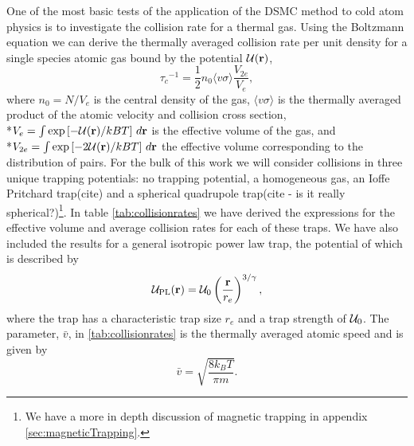 One of the most basic tests of the application of the DSMC method to cold atom physics is to investigate the collision rate for a thermal gas.
Using the Boltzmann equation we can derive \cite{Walraven2010} the thermally averaged collision rate per unit density for a single species atomic gas bound by the potential ${\cal U}(\mathbf{r})$,
\begin{equation}
    {\tau_c}^{-1} = \frac{1}{2} n_{0}\langle v\sigma \rangle \frac{V_{2e}}{V_e},
\end{equation}
where $n_0 = N / V_e$ is the central density of the gas, $\langle v\sigma \rangle$ is the thermally averaged product of the atomic velocity and collision cross section, \\*$V_e = \int \exp\left[-{\cal U}(\mathbf{r})/kBT\right]\, d\mathbf{r}$ is the effective volume of the gas, and \\*$V_{2e} = \int \exp\left[-2{\cal U}(\mathbf{r})/kBT\right]\, d\mathbf{r}$ the effective volume corresponding to the distribution of pairs.
For the bulk of this work we will consider collisions in three unique trapping potentials: no trapping potential, \ie  a homogeneous gas, an Ioffe Pritchard trap(cite) and a spherical quadrupole trap(cite - is it really spherical?)\footnote{We have a more in depth discussion of magnetic trapping in appendix \ref{sec:magneticTrapping}.}. 
In table \ref{tab:collisionrates} we have derived the expressions for the effective volume and average collision rates for each of these traps. We have also included the results for a general isotropic power law trap, the potential of which is described by
\begin{equation}
    {\cal U}_{\mathrm{PL}}(\mathbf{r}) = {\cal U}_0 \left(\frac{\mathbf{r}}{r_e}\right)^{3/\gamma}, \label{eq:powerlaw}
\end{equation}
where the trap has a characteristic trap size $r_e$ and a trap strength of ${\cal U}_0$. The parameter, $\bar{v}$, in
 \autoref{tab:collisionrates} is the thermally averaged atomic speed and is given by
\begin{equation*}
    \bar{v} = \sqrt{\frac{8 k_B T}{\pi m}}.
\end{equation*}

